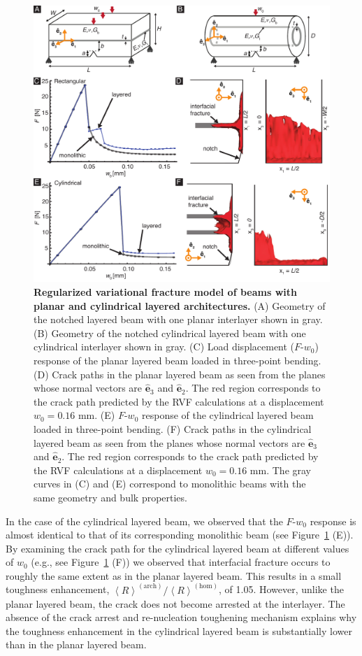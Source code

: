 \documentclass[12pt,onecolumn]{article}
\newcommand{\ey}{\hat{\mathbf{e}}_2}
\newcommand{\ez}{\hat{\mathbf{e}}_3}
\begin{document}
\begin{bibunit}
			\begin{figure}[ht!]
			\includegraphics[width=\textwidth]{../Figures/FigureVRF/FigureVRF_V3.pdf}
			\caption{\textbf{Regularized variational fracture model of beams with planar and cylindrical layered architectures.} (A) Geometry of the notched layered beam with one planar interlayer shown in gray. (B) Geometry of the notched cylindrical layered beam with one cylindrical interlayer shown in gray. (C) Load displacement ($F$-$w_0$) response of the planar layered beam loaded in three-point bending.  (D) Crack paths in the planar layered beam as seen from the planes whose normal vectors are $\ez$ and $\ey$. The red region corresponds to the crack path predicted by the RVF calculations at a displacement $w_0=0.16$ mm. (E) $F$-$w_0$ response of the cylindrical layered beam loaded in three-point bending.  (F) Crack paths in the cylindrical layered beam as seen from the planes whose normal vectors are $\ez$ and $\ey$. The red region corresponds to the crack path predicted by the RVF calculations at a displacement $w_0=0.16$ mm. The gray curves in (C) and (E) correspond to monolithic beams with the same geometry and bulk properties.}
			\label{fig:VF}
			\end{figure}

In the case of the cylindrical layered beam, we observed that the $F$-$w_0$ response is almost identical to that of its corresponding monolithic beam (see Figure~\ref{fig:VF} (E)). By examining the crack path for the cylindrical layered beam at different values of $w_0$ (e.g., see Figure~\ref{fig:VF} (F)) we observed that interfacial fracture occurs to roughly the same extent as in the planar layered beam. This results in a small toughness enhancement, $\left< R\right>^{(\mathrm{arch})}/\left< R\right>^{(\mathrm{hom})}$, of 1.05. However, unlike the planar layered beam, the crack does not become arrested at the interlayer. The absence of the crack arrest and re-nucleation toughening mechanism explains why the toughness enhancement in the cylindrical layered beam is substantially lower than in the planar layered beam.


\end{bibunit}
\end{document}
